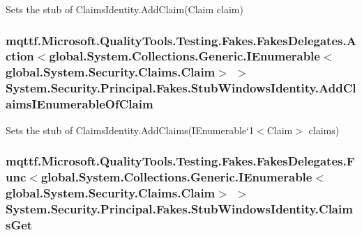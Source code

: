 Sets the stub of Claims\-Identity.\-Add\-Claim(\-Claim claim)

\hypertarget{class_system_1_1_security_1_1_principal_1_1_fakes_1_1_stub_windows_identity_ae2f806f43e19366de66515a6dda6677e}{
\subsubsection[{Add\-Claims\-I\-Enumerable\-Of\-Claim}]{\setlength{\rightskip}{0pt plus 5cm}mqttf.\-Microsoft.\-Quality\-Tools.\-Testing.\-Fakes.\-Fakes\-Delegates.\-Action$<$global.\-System.\-Collections.\-Generic.\-I\-Enumerable$<$global.\-System.\-Security.\-Claims.\-Claim$>$ $>$ System.\-Security.\-Principal.\-Fakes.\-Stub\-Windows\-Identity.\-Add\-Claims\-I\-Enumerable\-Of\-Claim}}\label{class_system_1_1_security_1_1_principal_1_1_fakes_1_1_stub_windows_identity_ae2f806f43e19366de66515a6dda6677e}


Sets the stub of Claims\-Identity.\-Add\-Claims(I\-Enumerable`1$<$Claim$>$ claims)

\hypertarget{class_system_1_1_security_1_1_principal_1_1_fakes_1_1_stub_windows_identity_a6535535f0bcc3180e795944483be0e13}{
\subsubsection[{Claims\-Get}]{\setlength{\rightskip}{0pt plus 5cm}mqttf.\-Microsoft.\-Quality\-Tools.\-Testing.\-Fakes.\-Fakes\-Delegates.\-Func$<$global.\-System.\-Collections.\-Generic.\-I\-Enumerable$<$global.\-System.\-Security.\-Claims.\-Claim$>$ $>$ System.\-Security.\-Principal.\-Fakes.\-Stub\-Windows\-Identity.\-Claims\-Get}}\label{class_system_1_1_security_1_1_principal_1_1_fakes_1_1_stub_windows_identity_a6535535f0bcc3180e795944483be0e13}


